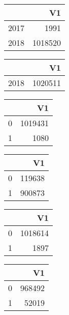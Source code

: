 \bigskip\bigskip
\centering
\begin{tabular}{rr}
  \hline
 & V1 \\ 
  \hline
2017 & 1991 \\ 
  2018 & 1018520 \\ 
   \hline
\end{tabular}

\bigskip\bigskip
\centering
\begin{tabular}{rr}
  \hline
 & V1 \\ 
  \hline
2018 & 1020511 \\ 
   \hline
\end{tabular}

\bigskip\bigskip
\centering
\begin{tabular}{rr}
  \hline
 & V1 \\ 
  \hline
0 & 1019431 \\ 
  1 & 1080 \\ 
   \hline
\end{tabular}

\bigskip\bigskip
\centering
\begin{tabular}{rr}
  \hline
 & V1 \\ 
  \hline
0 & 119638 \\ 
  1 & 900873 \\ 
   \hline
\end{tabular}

\bigskip\bigskip
\centering
\begin{tabular}{rr}
  \hline
 & V1 \\ 
  \hline
0 & 1018614 \\ 
  1 & 1897 \\ 
   \hline
\end{tabular}

\bigskip\bigskip
\centering
\begin{tabular}{rr}
  \hline
 & V1 \\ 
  \hline
0 & 968492 \\ 
  1 & 52019 \\ 
   \hline
\end{tabular}

